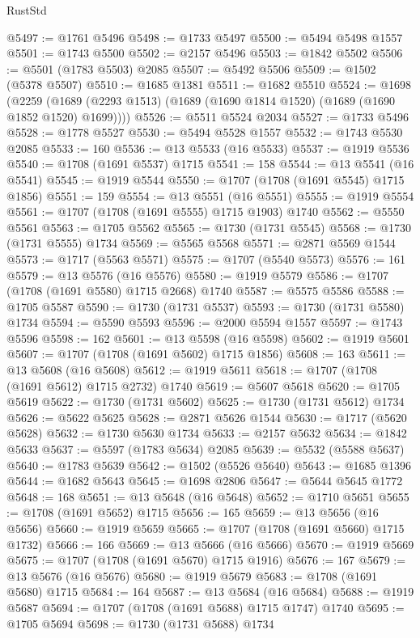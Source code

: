 \begin{lexlean}{RustStd}
\begin{coremodule}
@5497 := @1761 @5496
@5498 := @1733 @5497
@5500 := @5494 @5498 @1557
@5501 := @1743 @5500
@5502 := @2157 @5496
@5503 := @1842 @5502
@5506 := @5501 (@1783 @5503) @2085
@5507 := @5492 @5506
@5509 := @1502 (@5378 @5507)
@5510 := @1685 @1381
@5511 := @1682 @5510
@5524 := @1698
    (@2259 (@1689 (@2293 @1513) (@1689 (@1690 @1814 @1520) (@1689 (@1690 @1852 @1520) @1699))))
@5526 := @5511 @5524 @2034
@5527 := @1733 @5496
@5528 := @1778 @5527
@5530 := @5494 @5528 @1557
@5532 := @1743 @5530 @2085
@5533 := 160
@5536 := @13 @5533 (@16 @5533)
@5537 := @1919 @5536
@5540 := @1708 (@1691 @5537) @1715
@5541 := 158
@5544 := @13 @5541 (@16 @5541)
@5545 := @1919 @5544
@5550 := @1707 (@1708 (@1691 @5545) @1715 @1856)
@5551 := 159
@5554 := @13 @5551 (@16 @5551)
@5555 := @1919 @5554
@5561 := @1707 (@1708 (@1691 @5555) @1715 @1903) @1740
@5562 := @5550 @5561
@5563 := @1705 @5562
@5565 := @1730 (@1731 @5545)
@5568 := @1730 (@1731 @5555) @1734
@5569 := @5565 @5568
@5571 := @2871 @5569 @1544
@5573 := @1717 (@5563 @5571)
@5575 := @1707 (@5540 @5573)
@5576 := 161
@5579 := @13 @5576 (@16 @5576)
@5580 := @1919 @5579
@5586 := @1707 (@1708 (@1691 @5580) @1715 @2668) @1740
@5587 := @5575 @5586
@5588 := @1705 @5587
@5590 := @1730 (@1731 @5537)
@5593 := @1730 (@1731 @5580) @1734
@5594 := @5590 @5593
@5596 := @2000 @5594 @1557
@5597 := @1743 @5596
@5598 := 162
@5601 := @13 @5598 (@16 @5598)
@5602 := @1919 @5601
@5607 := @1707 (@1708 (@1691 @5602) @1715 @1856)
@5608 := 163
@5611 := @13 @5608 (@16 @5608)
@5612 := @1919 @5611
@5618 := @1707 (@1708 (@1691 @5612) @1715 @2732) @1740
@5619 := @5607 @5618
@5620 := @1705 @5619
@5622 := @1730 (@1731 @5602)
@5625 := @1730 (@1731 @5612) @1734
@5626 := @5622 @5625
@5628 := @2871 @5626 @1544
@5630 := @1717 (@5620 @5628)
@5632 := @1730 @5630 @1734
@5633 := @2157 @5632
@5634 := @1842 @5633
@5637 := @5597 (@1783 @5634) @2085
@5639 := @5532 (@5588 @5637)
@5640 := @1783 @5639
@5642 := @1502 (@5526 @5640)
@5643 := @1685 @1396
@5644 := @1682 @5643
@5645 := @1698 @2806
@5647 := @5644 @5645 @1772
@5648 := 168
@5651 := @13 @5648 (@16 @5648)
@5652 := @1710 @5651
@5655 := @1708 (@1691 @5652) @1715
@5656 := 165
@5659 := @13 @5656 (@16 @5656)
@5660 := @1919 @5659
@5665 := @1707 (@1708 (@1691 @5660) @1715 @1732)
@5666 := 166
@5669 := @13 @5666 (@16 @5666)
@5670 := @1919 @5669
@5675 := @1707 (@1708 (@1691 @5670) @1715 @1916)
@5676 := 167
@5679 := @13 @5676 (@16 @5676)
@5680 := @1919 @5679
@5683 := @1708 (@1691 @5680) @1715
@5684 := 164
@5687 := @13 @5684 (@16 @5684)
@5688 := @1919 @5687
@5694 := @1707 (@1708 (@1691 @5688) @1715 @1747) @1740
@5695 := @1705 @5694
@5698 := @1730 (@1731 @5688) @1734

\end{coremodule}
\end{lexlean}
